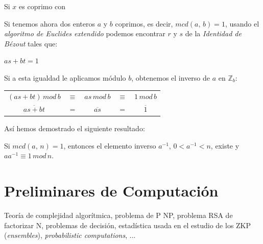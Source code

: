 \begin{theorem}[Euler]
	Si $x$ es coprimo con 
\end{theorem}


\hfil

Si tenemos ahora dos enteros $a$ y $b$ coprimos, es decir, $mcd(a,\,b) = 1$, usando el \textit{algoritmo de Euclides extendido} podemos encontrar $r$ y $s$ de la \textit{Identidad de Bézout} tales que:
\begin{center}
	$ as + bt = 1 $
\end{center}

Si a esta igualdad le aplicamos módulo $b$, obtenemos el inverso de $a$ en $\mathbb{Z}_b$:
\begin{center}
	\begin{tabular}{ccccc}
	$  ( as + bt ) \, mod \, b $ & $\equiv $ & $as \, mod \, b $ & $ \equiv$ & $1 \, mod \, b $ \\
	$ \overline{as+bt} $ & $=$ & $\overline{as} $ & $=$ & $\overline{1} $
\end{tabular}
\end{center}

Así hemos demostrado el siguiente resultado:

\begin{proposition}
	Si $mcd(a,\,n) = 1$, entonces el elemento inverso $a^{-1}$, $0<a^{-1}<n$, existe y $a a^{-1} \equiv 1 \, mod \, n$.
\end{proposition}


\hfil












%
%
%
%
%
%








\section{Preliminares de Computación}

Teoría de complejidad algorítmica, problema de P NP, problema RSA de factorizar N, problemas de decisión, estadística usada en el estudio de los ZKP (\textit{ensembles}), \textit{probabilistic computations}, ...

